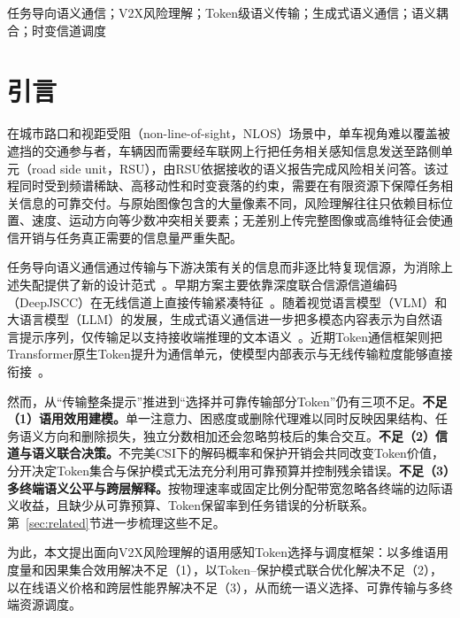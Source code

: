 \documentclass[journal]{IEEEtran}
\begin{document}
\begin{IEEEkeywords}
任务导向语义通信；V2X风险理解；Token级语义传输；生成式语义通信；语义耦合；时变信道调度
\end{IEEEkeywords}

\section{引言}

在城市路口和视距受阻（non-line-of-sight，NLOS）场景中，单车视角难以覆盖被遮挡的交通参与者，车辆因而需要经车联网上行把任务相关感知信息发送至路侧单元（road side unit，RSU），由RSU依据接收的语义报告完成风险相关问答。该过程同时受到频谱稀缺、高移动性和时变衰落的约束，需要在有限资源下保障任务相关信息的可靠交付。与原始图像包含的大量像素不同，风险理解往往只依赖目标位置、速度、运动方向等少数冲突相关要素；无差别上传完整图像或高维特征会使通信开销与任务真正需要的信息量严重失配。

任务导向语义通信通过传输与下游决策有关的信息而非逐比特复现信源，为消除上述失配提供了新的设计范式~\cite{gunduz2023beyond}。早期方案主要依靠深度联合信源信道编码（DeepJSCC）在无线信道上直接传输紧凑特征~\cite{bourtsoulatze2019deep,xie2021task}。随着视觉语言模型（VLM）和大语言模型（LLM）的发展，生成式语义通信进一步把多模态内容表示为自然语言提示序列，仅传输足以支持接收端推理的文本语义~\cite{Qiao2024latency,ren2025generative}。近期Token通信框架则把Transformer原生Token提升为通信单元，使模型内部表示与无线传输粒度能够直接衔接~\cite{qiao2025tokcom}。

然而，从“传输整条提示”推进到“选择并可靠传输部分Token”仍有三项不足。\textbf{不足（1）语用效用建模。}单一注意力、困惑度或删除代理难以同时反映因果结构、任务语义方向和删除损失，独立分数相加还会忽略剪枝后的集合交互。\textbf{不足（2）信道与语义联合决策。}不完美CSI下的解码概率和保护开销会共同改变Token价值，分开决定Token集合与保护模式无法充分利用可靠预算并控制残余错误。\textbf{不足（3）多终端语义公平与跨层解释。}按物理速率或固定比例分配带宽忽略各终端的边际语义收益，且缺少从可靠预算、Token保留率到任务错误的分析联系。第~\ref{sec:related}节进一步梳理这些不足。

为此，本文提出面向V2X风险理解的语用感知Token选择与调度框架：以多维语用度量和因果集合效用解决不足（1），以Token--保护模式联合优化解决不足（2），以在线语义价格和跨层性能界解决不足（3），从而统一语义选择、可靠传输与多终端资源调度。
\end{document}
